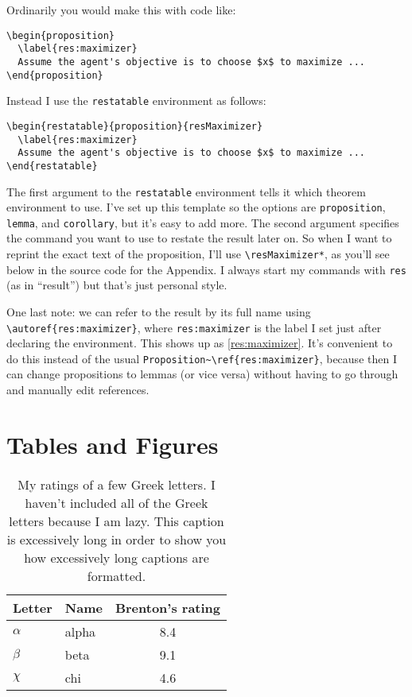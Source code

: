 \documentclass[12pt]{article}
\begin{document}
Ordinarily you would make this with code like:
\singlespacing
\begin{verbatim}
\begin{proposition}
  \label{res:maximizer}
  Assume the agent's objective is to choose $x$ to maximize ...
\end{proposition}
\end{verbatim}
\doublespacing
Instead I use the \verb|restatable| environment as follows:
\singlespacing
\begin{verbatim}
\begin{restatable}{proposition}{resMaximizer}
  \label{res:maximizer}
  Assume the agent's objective is to choose $x$ to maximize ...
\end{restatable}
\end{verbatim}
\doublespacing
The first argument to the \verb|restatable| environment tells it which theorem environment to use.
I've set up this template so the options are \verb|proposition|, \verb|lemma|, and \verb|corollary|, but it's easy to add more.
The second argument specifies the command you want to use to restate the result later on.
So when I want to reprint the exact text of the proposition, I'll use \verb|\resMaximizer*|, as you'll see below in the source code for the Appendix.
I always start my commands with \verb|res| (as in ``result'') but that's just personal style.

One last note: we can refer to the result by its full name using \verb|\autoref{res:maximizer}|, where \verb|res:maximizer| is the label I set just after declaring the environment.
This shows up as \autoref{res:maximizer}.
It's convenient to do this instead of the usual \verb|Proposition~\ref{res:maximizer}|, because then I can change propositions to lemmas (or vice versa) without having to go through and manually edit references.


\section{Tables and Figures}

\begin{table}[tbp]
  \centering
  \begin{tabular}{llc}
    \toprule
    Letter & Name & Brenton's rating \\
    \midrule
    $\alpha$ & alpha & 8.4 \\
    $\beta$ & beta & 9.1 \\
    $\chi$ & chi & 4.6 \\
    \bottomrule
  \end{tabular}
  \caption{My ratings of a few Greek letters.  I haven't included all of the Greek letters because I am lazy.  This caption is excessively long in order to show you how excessively long captions are formatted.}
  \label{tab:greek}
\end{table}
\end{document}
